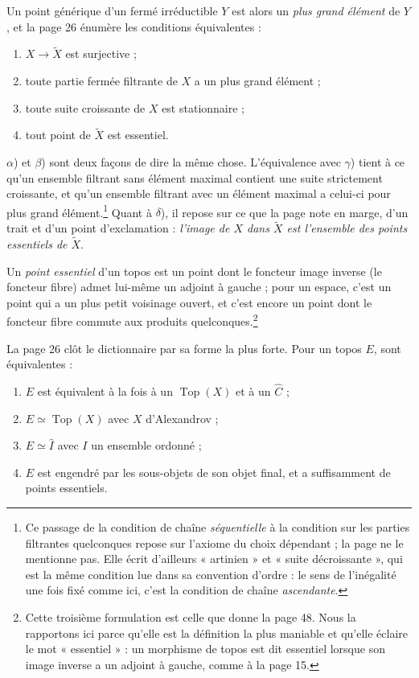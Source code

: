\documentclass[11pt,a4paper]{article}
\begin{document}
Un point générique d'un fermé irréductible $Y$ est alors un \emph{plus grand
élément} de $Y$, et la page 26 énumère les conditions équivalentes :

\begin{enumerate}
\item[$\alpha$)] $X \to \widetilde{X}$ est surjective ;
\item[$\beta$)] toute partie fermée filtrante de $X$ a un plus grand élément ;
\item[$\gamma$)] toute suite croissante de $X$ est stationnaire ;
\item[$\delta$)] tout point de $\widetilde{X}$ est essentiel.
\end{enumerate}

$\alpha$) et $\beta$) sont deux façons de dire la même chose. L'équivalence
avec $\gamma$) tient à ce qu'un ensemble filtrant sans élément maximal
contient une suite strictement croissante, et qu'un ensemble filtrant avec un
élément maximal a celui-ci pour plus grand élément.\footnote{Ce passage de la
condition de chaîne \emph{séquentielle} à la condition sur les parties
filtrantes quelconques repose sur l'axiome du choix dépendant ; la page ne le
mentionne pas. Elle écrit d'ailleurs « artinien » et « suite décroissante »,
qui est la même condition lue dans sa convention d'ordre : le sens de
l'inégalité une fois fixé comme ici, c'est la condition de chaîne
\emph{ascendante}.} Quant à $\delta$), il repose sur ce que la page note en
marge, d'un trait et d'un point d'exclamation : \emph{l'image de $X$ dans
$\widetilde{X}$ est l'ensemble des points essentiels de
$\widetilde{X}$}.

Un \emph{point essentiel} d'un topos est un point dont le foncteur image
inverse (le foncteur fibre) admet lui-même un adjoint à gauche ; pour un
espace, c'est un point qui a un plus petit voisinage ouvert, et c'est encore un
point dont le foncteur fibre commute aux produits quelconques.\footnote{Cette
troisième formulation est celle que donne la page 48. Nous
la rapportons ici parce qu'elle est la définition la plus maniable et qu'elle
éclaire le mot « essentiel » : un morphisme de topos est dit essentiel lorsque
son image inverse a un adjoint à gauche, comme à la page 15.}

La page 26 clôt le dictionnaire par sa forme la plus forte. Pour un topos $E$,
sont équivalentes :

\begin{enumerate}
\item[$\alpha$)] $E$ est équivalent à la fois à un $\operatorname{Top}(X)$ et à
un $\widehat{C}$ ;
\item[$\beta$)] $E \simeq \operatorname{Top}(X)$ avec $X$ d'Alexandrov ;
\item[$\gamma$)] $E \simeq \widehat{I}$ avec $I$ un ensemble ordonné ;
\item[$\delta$)] $E$ est engendré par les sous-objets de son objet final, et a
suffisamment de points essentiels.
\end{enumerate}
\end{document}

